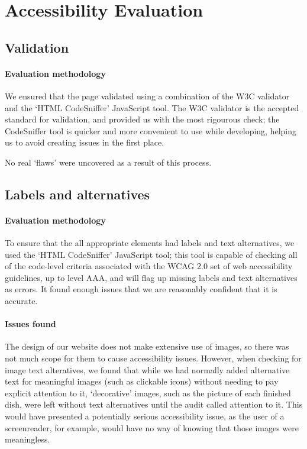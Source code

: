 \section{Accessibility Evaluation}

\subsection{Validation}

\paragraph{Evaluation methodology}
We ensured that the page validated using a combination of the W3C
validator\cite{w3validator} and the
`HTML CodeSniffer' JavaScript tool\cite{htmlcodesniffer}. The W3C
validator is the accepted standard for validation, and provided us
with the most rigourous check; the CodeSniffer tool is quicker and
more convenient to use while developing, helping us to avoid creating
issues in the first place.

No real `flaws' were uncovered as a result of this process.

\subsection{Labels and alternatives}

\paragraph{Evaluation methodology}
To ensure that the all appropriate elements had labels and text
alternatives, we used the `HTML CodeSniffer' JavaScript tool; this
tool is capable of checking all of the code-level criteria associated
with the WCAG 2.0 set of web accessibility guidelines\cite{wcag2}, up to level AAA, and will flag up missing labels and
text alternatives as errors. It found enough issues that we are
reasonably confident that it is accurate.

\paragraph{Issues found}
The design of our website does not make extensive use of images, so
there was not much scope for them to cause accessibility
issues. However, when checking for image text alteratives, we found
that while we had normally added alternative text for meaningful
images (such as clickable icons) without needing to pay explicit
attention to it, `decorative' images, such as the picture of each
finished dish, were left without text alternatives until the audit
called attention to it. This would have presented a potentially
serious accessibility issue, as the user of a screenreader, for
example, would have no way of knowing that those images were
meaningless.

